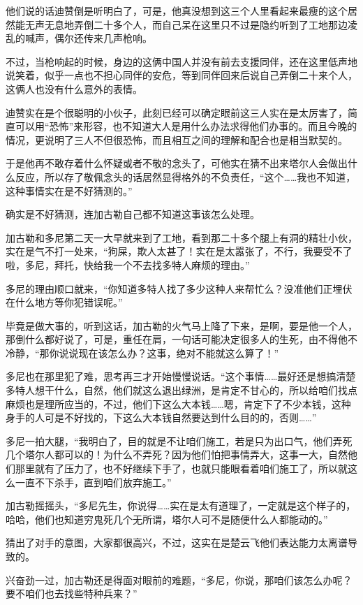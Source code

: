 他们说的话迪赞倒是听明白了，可是，他真没想到这三个人里看起来最瘦的这个居然能无声无息地弄倒二十多个人，而自己呆在这里只不过是隐约听到了工地那边凌乱的喊声，偶尔还传来几声枪响。

不过，当枪响起的时候，身边的这俩中国人并没有前去支援同伴，还在这里低声地说笑着，似乎一点也不担心同伴的安危，等到同伴回来后说自己弄倒二十来个人，这俩人也没有什么意外的表情。

迪赞实在是个很聪明的小伙子，此刻已经可以确定眼前这三人实在是太厉害了，简直可以用“恐怖”来形容，也不知道大人是用什么办法求得他们办事的。而且今晚的情况，更说明了三人不但很恐怖，而且相互之间的理解和配合也是相当默契的。

于是他再不敢存着什么怀疑或者不敬的念头了，可他实在猜不出来塔尔人会做出什么反应，所以存了敬佩念头的话居然显得格外的不负责任，“这个……我也不知道，这种事情实在是不好猜测的。”

确实是不好猜测，连加古勒自己都不知道这事该怎么处理。

加古勒和多尼第二天一大早就来到了工地，看到那二十多个腿上有洞的精壮小伙，实在是气不打一处来，“狗屎，欺人太甚了！实在是太嚣张了，不行，我要受不了啦，多尼，拜托，快给我一个不去找多特人麻烦的理由。”

多尼的理由顺口就来，“你知道多特人找了多少这种人来帮忙么？没准他们正埋伏在什么地方等你犯错误呢。”

毕竟是做大事的，听到这话，加古勒的火气马上降了下来，是啊，要是他一个人，那倒什么都好说了，可是，重任在肩，一句话可能决定很多人的生死，由不得他不冷静，“那你说说现在该怎么办？这事，绝对不能就这么算了！”

多尼也在那里犯了难，思考再三才开始慢慢说话。“这个事情……最好还是想搞清楚多特人想干什么，自然，他们就这么退出绿洲，是肯定不甘心的，所以给咱们找点麻烦也是理所应当的，不过，他们下这么大本钱……嗯，肯定下了不少本钱，这种身手的人可是不好找的，下这么大本钱自然要达到什么目的的，否则……”

多尼一拍大腿，“我明白了，目的就是不让咱们施工，若是只为出口气，他们弄死几个塔尔人都可以的！为什么不弄死？因为他们怕把事情弄大，这事一大，自然他们那里就有了压力了，也不好继续下手了，也就只能眼看着咱们施工了，所以就这么一直不下杀手，直到咱们放弃施工。”

加古勒摇摇头，“多尼先生，你说得……实在是太有道理了，一定就是这个样子的，哈哈，他们也知道穷鬼死几个无所谓，塔尔人可不是随便什么人都能动的。”

猜出了对手的意图，大家都很高兴，不过，这实在是楚云飞他们表达能力太离谱导致的。

兴奋劲一过，加古勒还是得面对眼前的难题，“多尼，你说，那咱们该怎么办呢？要不咱们也去找些特种兵来？”

